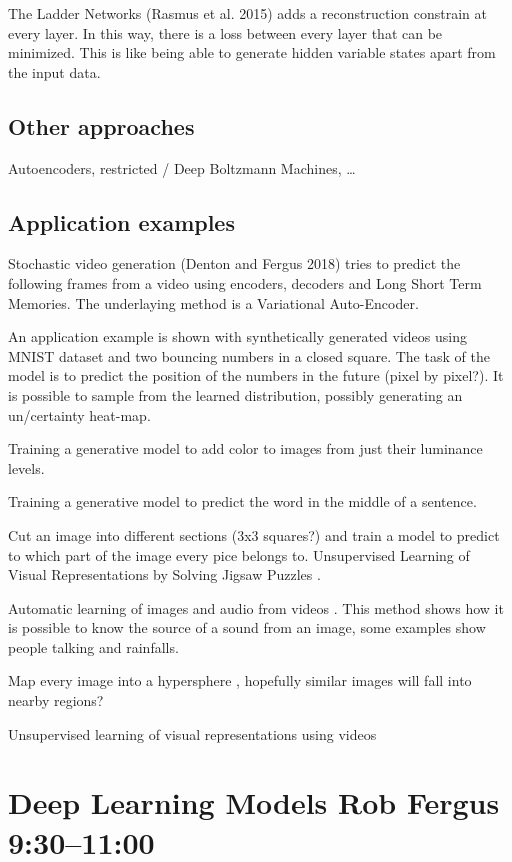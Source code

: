 \documentclass[b5paper]{report}
\begin{document}
The Ladder Networks (Rasmus et al. 2015) adds a reconstruction constrain at
every layer. In this way, there is a loss between every layer that can be
minimized. This is like being able to generate hidden variable states apart
from the input data.

\subsection{Other approaches}

Autoencoders, restricted / Deep Boltzmann Machines, \dots

\subsection{Application examples}

Stochastic video generation (Denton and Fergus 2018) tries to predict the
following frames from a video using encoders, decoders and Long Short Term
Memories. The underlaying method is a Variational Auto-Encoder.

An application example is shown with synthetically generated videos using MNIST
dataset and two bouncing numbers in a closed square. The task of the model is
to predict the position of the numbers in the future (pixel by pixel?). It is
possible to sample from the learned distribution, possibly generating an
un/certainty heat-map.

Training a generative model to add color to images from just their luminance
levels.

Training a generative model to predict the word in the middle of a sentence.

Cut an image into different sections (3x3 squares?) and train a model to
predict to which part of the image every pice belongs to. Unsupervised Learning
of Visual Representations by Solving Jigsaw Puzzles \cite{Noroozi2016}.

Automatic learning of images and audio from videos \cite{Owens2016}. This
method shows how it is possible to know the source of a sound from an image,
some examples show people talking and rainfalls.

Map every image into a hypersphere \cite{bojanowski2017}, hopefully similar
images will fall into nearby regions?

Unsupervised learning of visual representations using videos
\cite{wang2015unsupervised}

\section{Deep Learning Models Rob Fergus 9:30--11:00}
\end{document}
